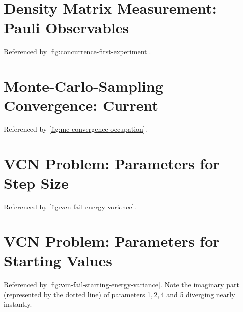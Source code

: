 \newpage
\begin{minipage}{\textwidth}
    \section{Density Matrix Measurement: Pauli Observables}
        \label{appendix:pauli-measurements}
        Referenced by \autoref{fig:concurrence-first-experiment}.\\
        \vbox{
        }
\end{minipage}

\newpage
\begin{minipage}{\textwidth}
    \section{Monte-Carlo-Sampling Convergence: Current}
        \label{appendix:mc-convergence-spin-current}
        Referenced by \autoref{fig:mc-convergence-occupation}.\\
        \vbox{
        }
\end{minipage}

\newpage
\begin{minipage}{\textwidth}
    \section{VCN Problem: Parameters for Step Size}
        \label{appendix:vcn-fail-parameters}
        Referenced by \autoref{fig:vcn-fail-energy-variance}.\\
        \vbox{
        }
\end{minipage}

\newpage
\begin{minipage}{\textwidth}
    \section{VCN Problem: Parameters for Starting Values}
        \label{appendix:vcn-fail-starting-parameters}
        Referenced by \autoref{fig:vcn-fail-starting-energy-variance}. Note the imaginary part (represented by the dotted line) of parameters 1,\,2,\,4 and 5 diverging nearly instantly.\\
        \vbox{
        }
\end{minipage}

